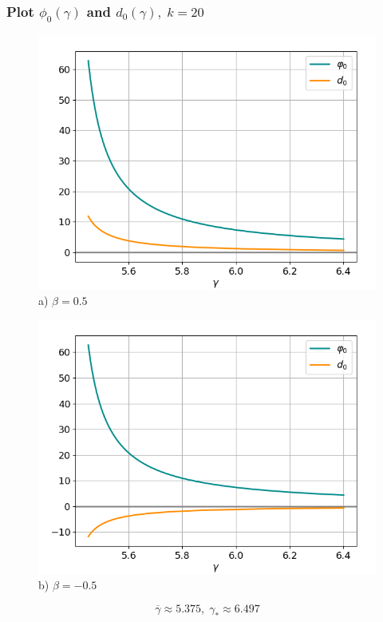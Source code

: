 \documentclass[fullscreen=true, unicode, bookmarks=false]{beamer}
\begin{document}
\begin{frame}
\frametitle{ Plot $ \phi_0(\gamma) $ and $ d_0(\gamma), \; k = 20 $ }

\begin{figure} 
\begin{minipage}[h]{0.49\linewidth}
\begin{center}
\includegraphics[scale=0.39]{divergent_phid_x0_039_beta_05-1.png} \\ {\scriptsize a) $ \beta = 0.5 $}
\end{center}
\end{minipage} 
\hfill
\begin{minipage}[h]{0.49\linewidth}
\begin{center}
\includegraphics[scale=0.39]{divergent_phid_x0_039_beta_-05-1.png}  \\ {\scriptsize b) $ \beta = -0.5 $}
\end{center}
\end{minipage} 
\end{figure}
$$ \overline{\gamma} \approx 5.375, \; \gamma_* \approx 6.497 $$

\end{frame}
\end{document}
